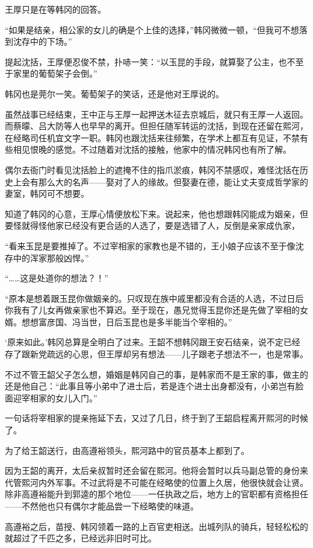王厚只是在等韩冈的回答。

“如果是结亲，相公家的女儿的确是个上佳的选择，”韩冈微微一顿，“但我可不想落到沈存中的下场。”

提起沈括，王厚便忍俊不禁，扑哧一笑：“以玉昆的手段，就算娶了公主，也不至于家里的葡萄架子会倒。”

韩冈也是莞尔一笑。葡萄架子的笑话，还是他对王厚说的。

虽然战事已经结束，王中正与王厚一起押送木征去京城后，就只有王厚一人返回。而蔡曚、吕大防等人也早早的离开。但担任随军转运的沈括，到现在还留在熙河，在经略司任机宜文字一职。韩冈也跟沈括来往频繁，在学术上都互有见证，不禁有些相见恨晚的感觉。不过随着对沈括的接触，他家中的情况韩冈也有所了解。

偶尔去衙门时看见沈括脸上的遮掩不住的指爪淤痕，韩冈不禁感叹，难怪沈括在历史上会有那么大的名声——娶对了人的缘故。但娶妻在德，能让丈夫变成哲学家的妻室，韩冈可不想要。

知道了韩冈的心意，王厚心情便放松下来。说起来，他也想跟韩冈能成为姻亲，但要怪就得怪他家已经没有更合适的人选了，要是选错了人，反倒是亲家成仇家，

“看来玉昆是要推掉了。不过宰相家的家教也是不错的，王小娘子应该不至于像沈存中的浑家那般凶悍。”

“……这是处道你的想法？！”

“原本是想着跟玉昆你做姻亲的。只叹现在族中戚里都没有合适的人选，不过日后你我有了儿女再做亲家也不算迟。至于现在，愚兄觉得玉昆你还是先做了宰相的女婿。想想富彦国、冯当世，日后玉昆也是多半能当个宰相的。”

‘原来如此。’韩冈总算是全明白了过来。王韶不想韩冈跟王安石结亲，说不定已经存了跟新党疏远的心思，但王厚却另有想法——儿子跟老子想法不一，也是常事。

不过不管王韶父子怎么想，婚姻是韩冈自己的事，是韩家而不是王家的事，做主的还是他自己：“此事且等小弟中了进士后，若是连个进士出身都没有，小弟岂有脸面迎宰相家的女儿入门。”

一句话将宰相家的提亲拖延下去，又过了几日，终于到了王韶启程离开熙河的时候了。

为了给王韶送行，由高遵裕领头，熙河路中的官员基本上都到了。

因为王韶的离开，太后亲叔暂时还会留在熙河。他将会暂时以兵马副总管的身份来代管熙河内外军事。不过武将是不可能在经略使的位置上久居，他很快就会让贤。除非高遵裕能升到郭逵的那个地位——一任执政之后，地方上的官职都有资格担任——不然他也只有偶尔才能品尝一下经略使的味道。

高遵裕之后，苗授、韩冈领着一路的上百官吏相送。出城列队的骑兵，轻轻松松的就超过了千匹之多，已经远非旧时可比。

